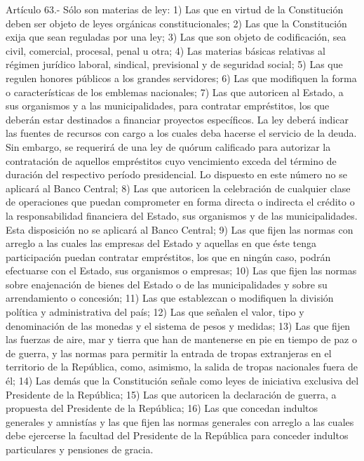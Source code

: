     Artículo 63.- Sólo son materias de ley:
    1) Las que en virtud de la Constitución deben ser objeto de leyes orgánicas constitucionales;
    2) Las que la Constitución exija que sean reguladas por una ley;
    3) Las que son objeto de codificación, sea civil, comercial, procesal, penal u otra;
    4) Las materias básicas relativas al régimen jurídico laboral, sindical, previsional y de seguridad social;
    5) Las que regulen honores públicos a los grandes servidores;
    6) Las que modifiquen la forma o características de los emblemas nacionales;
    7) Las que autoricen al Estado, a sus organismos y a las municipalidades, para contratar empréstitos, los que deberán estar destinados a financiar proyectos específicos. La ley deberá indicar las fuentes de recursos con cargo a los cuales deba hacerse el servicio de la deuda. Sin embargo, se requerirá de una ley de quórum calificado para autorizar la contratación de aquellos empréstitos cuyo vencimiento exceda del término de duración del respectivo período presidencial.
    Lo dispuesto en este número no se aplicará al Banco Central;
    8) Las que autoricen la celebración de cualquier clase de operaciones que puedan comprometer en forma directa o indirecta el crédito o la responsabilidad financiera del Estado, sus organismos y de las municipalidades.
    Esta disposición no se aplicará al Banco Central;
    9) Las que fijen las normas con arreglo a las cuales las empresas del Estado y aquellas en que éste tenga participación puedan contratar empréstitos, los que en ningún caso, podrán efectuarse con el Estado, sus organismos o empresas;
    10) Las que fijen las normas sobre enajenación de bienes del Estado o de las municipalidades y sobre su arrendamiento o concesión;
    11) Las que establezcan o modifiquen la división política y administrativa del país;
    12) Las que señalen el valor, tipo y denominación de las monedas y el sistema de pesos y medidas;
    13) Las que fijen las fuerzas de aire, mar y tierra que han de mantenerse en pie en tiempo de paz o de guerra, y las normas para permitir la entrada de tropas extranjeras en el territorio de la República, como, asimismo, la salida de tropas nacionales fuera de él;
    14) Las demás que la Constitución señale como leyes de iniciativa exclusiva del Presidente de la República;
    15) Las que autoricen la declaración de guerra, a propuesta del Presidente de la República;
    16) Las que concedan indultos generales y amnistías y las que fijen las normas generales con arreglo a las cuales debe ejercerse la facultad del Presidente de la República para conceder indultos particulares y pensiones de gracia.
